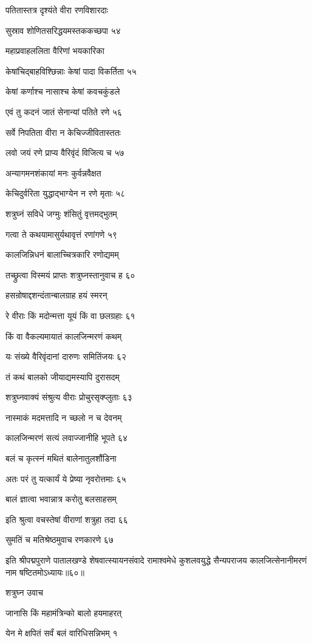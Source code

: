 पतितास्तत्र दृश्यंते वीरा रणविशारदाः

सुस्राव शोणितसरिद्धयमस्तककच्छपा ५४

महाप्रवाहललिता वैरिणां भयकारिका

केषांचिद्बाहविश्छिन्नाः केषां पादा विकर्तिता ५५

केषां कर्णाश्च नासाश्च केषां कवचकुंडले

एवं तु कदनं जातं सेनान्यां पतिते रणे ५६

सर्वे निपतिता वीरा न केचिज्जीवितास्ततः

लवो जयं रणे प्राप्य वैरिवृंदं विजित्य च ५७

अन्यागमनशंकायां मनः कुर्वन्नवैक्षत

केचिदुर्वरिता युद्धाद्भाग्येन न रणे मृताः ५८

शत्रुघ्नं सविधे जग्मुः शंसितुं वृत्तमद्भुतम्

गत्वा ते कथयामासुर्यथावृत्तं रणांगणे ५९

कालजिन्निधनं बालाच्चित्रकारि रणोद्यमम्

तच्छ्रुत्वा विस्मयं प्राप्तः शत्रुघ्नस्तानुवाच ह ६०

हसन्रोषाद्दशन्दंतान्बालग्राह हयं स्मरन्

रे वीराः किं मदोन्मत्ता यूयं किं वा छलग्रहाः ६१

किं वा वैकल्यमायातं कालजिन्मरणं कथम्

यः संख्ये वैरिवृंदानां दारुणः समितिंजयः ६२

तं कथं बालको जीयाद्यमस्यापि दुरासदम्

शत्रुघ्नवाक्यं संश्रुत्य वीराः प्रोचुरसृक्प्लुताः ६३

नास्माकं मदमत्तादि न च्छलो न च देवनम्

कालजिन्मरणं सत्यं लवाज्जानीहि भूपते ६४

बलं च कृत्स्नं मथितं बालेनातुलशौंडिना

अतः परं तु यत्कार्यं ये प्रेष्या नृवरोत्तमाः ६५

बालं ज्ञात्वा भवान्नात्र करोतु बलसाहसम्

इति श्रुत्वा वचस्तेषां वीराणां शत्रुहा तदा ६६

सुमतिं च मतिश्रेष्ठमुवाच रणकारणे ६७

इति श्रीपद्मपुराणे पातालखण्डे शेषवात्स्यायनसंवादे रामाश्वमेधे कुशलवयुद्धे सैन्यपराजय कालजित्सेनानीमरणं नाम षष्टितमोऽध्यायः॥६०॥


शत्रुघ्न उवाच

जानासि किं महामंत्रिन्को बालो हयमाहरत्

येन मे क्षपितं सर्वं बलं वारिधिसन्निभम् १

